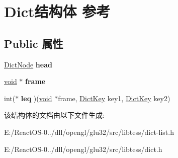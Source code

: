 \hypertarget{struct_dict}{}\section{Dict结构体 参考}
\label{struct_dict}
\subsection*{Public 属性}
\begin{DoxyCompactItemize}
\item 
\mbox{\label{struct_dict_a171a2eb4409aee73dad76eecb980a0c4}} 
\hyperlink{struct_dict_node}{Dict\+Node} {\bfseries head}
\item 
\mbox{\label{struct_dict_af6ef6f5cec9fd34f9d513183ec4fed39}} 
\hyperlink{interfacevoid}{void} $\ast$ {\bfseries frame}
\item 
\mbox{\label{struct_dict_a5015e9606b26b3b1b8cff8f757c3aa72}} 
int($\ast$ {\bfseries leq} )(\hyperlink{interfacevoid}{void} $\ast$frame, \hyperlink{interfacevoid}{Dict\+Key} key1, \hyperlink{interfacevoid}{Dict\+Key} key2)
\end{DoxyCompactItemize}


该结构体的文档由以下文件生成\+:\begin{DoxyCompactItemize}
\item 
E\+:/\+React\+O\+S-\/0../dll/opengl/glu32/src/libtess/dict-\/list.\+h\item 
E\+:/\+React\+O\+S-\/0../dll/opengl/glu32/src/libtess/dict.\+h\end{DoxyCompactItemize}

